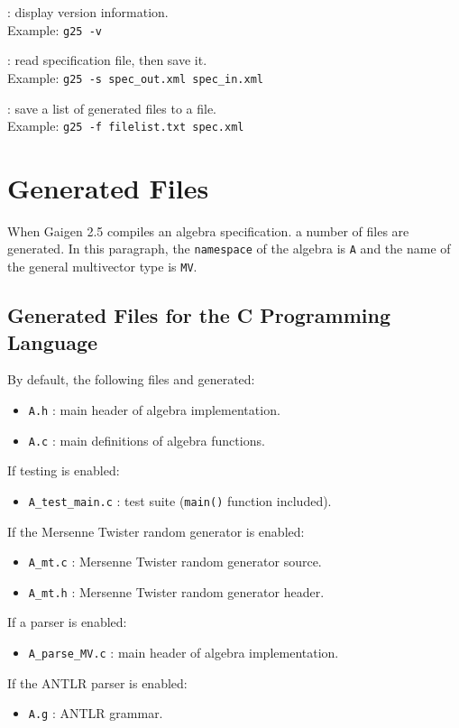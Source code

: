 \documentclass[10pt, a4paper]{article}
\begin{document}
\vspace*{2mm}

: display version information.\\
Example: {\tt g25 -v}

\vspace*{2mm}

: read specification file, then save it.\\
Example: {\tt g25 -s spec\_out.xml spec\_in.xml}

\vspace*{2mm}

: save a list of generated files to a file.\\
Example: {\tt g25 -f filelist.txt spec.xml}

\section{Generated Files}

When Gaigen 2.5 compiles an algebra specification. a number of files
are generated.
In this paragraph, the {\tt namespace} of the algebra is {\tt A} and
the name of the general multivector type is {\tt MV}.

\subsection{Generated Files for the C Programming Language}

By default, the following files and generated:
\begin{itemize}
\item {\tt A.h} : main header of algebra implementation.
\item {\tt A.c} : main definitions of algebra functions.
\end{itemize}
If testing is enabled:
\begin{itemize}
\item {\tt A\_test\_main.c} : test suite ({\tt main()} function included).
\end{itemize}
If the Mersenne Twister random generator is enabled:
\begin{itemize}
\item {\tt A\_mt.c} : Mersenne Twister random generator source.
\item {\tt A\_mt.h} : Mersenne Twister random generator header.
\end{itemize}
If a parser is enabled:
\begin{itemize}
\item {\tt A\_parse\_MV.c} : main header of algebra implementation.
\end{itemize}
If the ANTLR parser is enabled:
\begin{itemize}
\item {\tt A.g} : ANTLR grammar.
\end{itemize}
\end{document}
